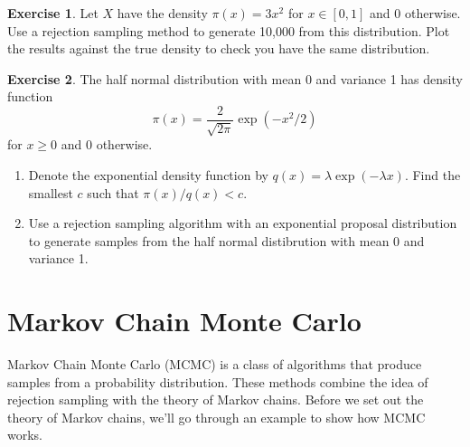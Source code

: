 \documentclass[
]{book}
\providecommand{\tightlist}{%
  \setlength{\itemsep}{0pt}\setlength{\parskip}{0pt}}
\theoremstyle{definition}
\theoremstyle{definition}
\theoremstyle{definition}
\newtheorem{exercise}{Exercise}[chapter]
\theoremstyle{definition}
\theoremstyle{remark}
\begin{document}
\begin{exercise}
Let \(X\) have the density \(\pi(x) = 3x^2\) for \(x \in [0, 1]\) and 0 otherwise. Use a rejection sampling method to generate 10,000 from this distribution. Plot the results against the true density to check you have the same distribution.
\end{exercise}

\begin{exercise}

The half normal distribution with mean 0 and variance 1 has density function
\[
\pi(x) = \frac{2}{\sqrt{2\pi}}\exp{(-x^2/2)}
\]
for \(x \geq 0\) and 0 otherwise.

\begin{enumerate}
\def\labelenumi{\arabic{enumi}.}
\tightlist
\item
  Denote the exponential density function by \(q(x) = \lambda \exp(-\lambda x)\). Find the smallest \(c\) such that \(\pi(x)/q(x) < c\).
\item
  Use a rejection sampling algorithm with an exponential proposal distribution to generate samples from the half normal distibrution with mean 0 and variance 1.
\end{enumerate}

\end{exercise}

\hypertarget{markov-chain-monte-carlo}{%
\chapter{Markov Chain Monte Carlo}\label{markov-chain-monte-carlo}}

Markov Chain Monte Carlo (MCMC) is a class of algorithms that produce samples from a probability distribution. These methods combine the idea of rejection sampling with the theory of Markov chains. Before we set out the theory of Markov chains, we'll go through an example to show how MCMC works.
\end{document}
